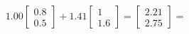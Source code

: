 \documentclass[preview]{standalone}
\begin{document}
\begin{align*}
1.00 \begin{bmatrix} 0.8 \\ 0.5 \end{bmatrix} + 1.41 \begin{bmatrix} 1 \\ 1.6 \end{bmatrix} = \begin{bmatrix} 2.21 \\ 2.75 \end{bmatrix} =
\end{align*}
\end{document}
